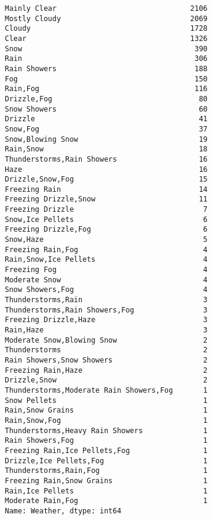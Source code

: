 \documentclass[11pt]{article}
\makeatletter
\newcommand{\boxspacing}{\kern\kvtcb@left@rule\kern\kvtcb@boxsep}
\newcommand{\prompt}[4]{
        {\ttfamily\llap{{\color{#2}[#3]:\hspace{3pt}#4}}\vspace{-\baselineskip}}
    }
\makeatother
\begin{document}
            \begin{tcolorbox}[breakable, size=fbox, boxrule=.5pt, pad at break*=1mm, opacityfill=0]
\prompt{Out}{outcolor}{26}{\boxspacing}
\begin{Verbatim}[commandchars=\\\{\}]
Mainly Clear                               2106
Mostly Cloudy                              2069
Cloudy                                     1728
Clear                                      1326
Snow                                        390
Rain                                        306
Rain Showers                                188
Fog                                         150
Rain,Fog                                    116
Drizzle,Fog                                  80
Snow Showers                                 60
Drizzle                                      41
Snow,Fog                                     37
Snow,Blowing Snow                            19
Rain,Snow                                    18
Thunderstorms,Rain Showers                   16
Haze                                         16
Drizzle,Snow,Fog                             15
Freezing Rain                                14
Freezing Drizzle,Snow                        11
Freezing Drizzle                              7
Snow,Ice Pellets                              6
Freezing Drizzle,Fog                          6
Snow,Haze                                     5
Freezing Rain,Fog                             4
Rain,Snow,Ice Pellets                         4
Freezing Fog                                  4
Moderate Snow                                 4
Snow Showers,Fog                              4
Thunderstorms,Rain                            3
Thunderstorms,Rain Showers,Fog                3
Freezing Drizzle,Haze                         3
Rain,Haze                                     3
Moderate Snow,Blowing Snow                    2
Thunderstorms                                 2
Rain Showers,Snow Showers                     2
Freezing Rain,Haze                            2
Drizzle,Snow                                  2
Thunderstorms,Moderate Rain Showers,Fog       1
Snow Pellets                                  1
Rain,Snow Grains                              1
Rain,Snow,Fog                                 1
Thunderstorms,Heavy Rain Showers              1
Rain Showers,Fog                              1
Freezing Rain,Ice Pellets,Fog                 1
Drizzle,Ice Pellets,Fog                       1
Thunderstorms,Rain,Fog                        1
Freezing Rain,Snow Grains                     1
Rain,Ice Pellets                              1
Moderate Rain,Fog                             1
Name: Weather, dtype: int64
\end{Verbatim}
\end{tcolorbox}
        
\end{document}
